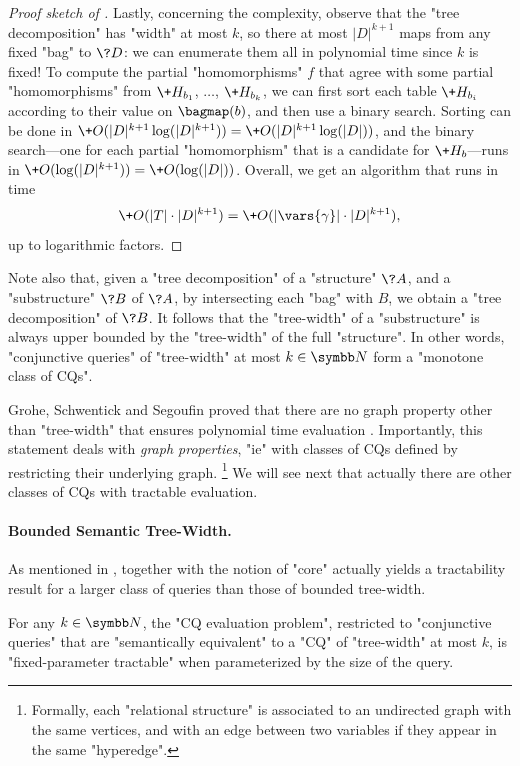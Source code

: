 \begin{proof}[Proof sketch of {}]
	Lastly, concerning the complexity, observe that the "tree decomposition"
	has "width" at most $k$, so there at most
	$|D|^{k+1}$ maps from any fixed "bag" to $\?D$: we can enumerate them all
	in polynomial time since $k$ is fixed! 
	To compute the partial "homomorphisms" $f$ that agree with
	some partial "homomorphisms" from $\+H_{b_1}$, $\dotsc$, $\+H_{b_k}$,
	we can first sort each table $\+H_{b_i}$ according to their value on $\bagmap(b)$,
	and then use a binary search. Sorting can be done
	in $\+O(|D|^{k+1}\log(|D|^{k+1})) = \+O(|D|^{k+1}\log(|D|))$,
	and the binary search---one for each partial "homomorphism" that is a candidate
	for $\+H_b$---runs in $\+O(\log(|D|^{k+1})) = \+O(\log(|D|))$.
	Overall, we get an algorithm that runs in time
	\[
		\+O(|T|\cdot |D|^{k+1}) = \+O(|\vars{\gamma}|\cdot |D|^{k+1}),
	\]
	up to logarithmic factors.
\end{proof}

Note also that, given a "tree decomposition" of a "structure" $\?A$,
and a "substructure" $\?B$ of $\?A$, by intersecting each "bag" with $B$,
we obtain a "tree decomposition" of $\?B$. It follows that the "tree-width"
of a "substructure" is always upper bounded by the "tree-width" of the full "structure".
In other words, "conjunctive queries" of "tree-width" at most $k\in\N$
form a "monotone class of CQs".

Grohe, Schwentick and Segoufin proved that there
are no graph property other than "tree-width" that ensures
polynomial time evaluation 
\cite[Corollary~19]{GroheSchwentickSegoufin2001Evaluation}.
Importantly, this statement deals with \emph{graph properties},
"ie" with classes of CQs defined by restricting their underlying graph.%
\footnote{Formally, each "relational structure" is associated to an undirected graph
with the same vertices, and with an edge between two variables if they appear in
the same "hyperedge".}
We will see next that actually there are other classes of CQs
with tractable evaluation.

\paragraph*{Bounded Semantic Tree-Width.}
As mentioned in , 
together with the notion of "core" actually yields a tractability result
for a larger class of queries than those of bounded tree-width.

\begin{proposition}
	For any $k\in\N$, the "CQ evaluation problem",
	restricted to "conjunctive queries" that are "semantically equivalent" 
	to a "CQ" of "tree-width" at most $k$, is "fixed-parameter tractable"
	when parameterized by the size of the query.
\end{proposition}

